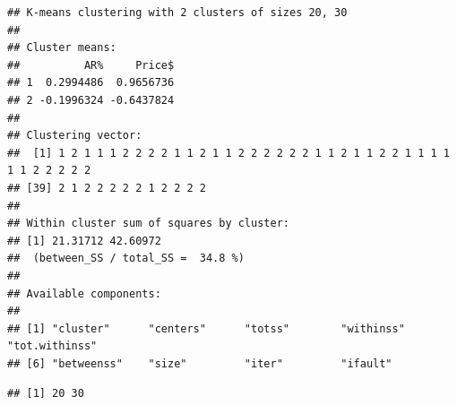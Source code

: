 \documentclass[]{article}
\newenvironment{Shaded}{\begin{snugshade}}{\end{snugshade}}
\newcommand{\KeywordTok}[1]{\textcolor[rgb]{0.13,0.29,0.53}{\textbf{#1}}}
\newcommand{\DataTypeTok}[1]{\textcolor[rgb]{0.13,0.29,0.53}{#1}}
\newcommand{\DecValTok}[1]{\textcolor[rgb]{0.00,0.00,0.81}{#1}}
\newcommand{\StringTok}[1]{\textcolor[rgb]{0.31,0.60,0.02}{#1}}
\newcommand{\OperatorTok}[1]{\textcolor[rgb]{0.81,0.36,0.00}{\textbf{#1}}}
\newcommand{\NormalTok}[1]{#1}
\begin{document}
\begin{Shaded}
\end{Shaded}

\begin{verbatim}
## K-means clustering with 2 clusters of sizes 20, 30
## 
## Cluster means:
##          AR%     Price$
## 1  0.2994486  0.9656736
## 2 -0.1996324 -0.6437824
## 
## Clustering vector:
##  [1] 1 2 1 1 1 2 2 2 2 1 1 2 1 1 2 2 2 2 2 2 1 1 2 1 1 2 2 1 1 1 1 1 1 2 2 2 2 2
## [39] 2 1 2 2 2 2 2 1 2 2 2 2
## 
## Within cluster sum of squares by cluster:
## [1] 21.31712 42.60972
##  (between_SS / total_SS =  34.8 %)
## 
## Available components:
## 
## [1] "cluster"      "centers"      "totss"        "withinss"     "tot.withinss"
## [6] "betweenss"    "size"         "iter"         "ifault"
\end{verbatim}

\begin{Shaded}
\end{Shaded}

\begin{verbatim}
## [1] 20 30
\end{verbatim}

\begin{Shaded}
\end{Shaded}
\end{document}
